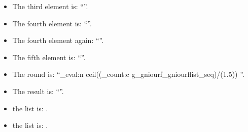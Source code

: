\documentclass{article}
\newcommand{\fourthelement}{\getnthelement{4}}
\begin{document}
\addtogniourflist[fiddle]{}
\getsizelist[fiddle]

\begin{itemize}
\item The third element is: ``''.
\item The fourth element is: ``\fourthelement''.
\item The fourth element again: ``\fourthelement''.
\item The fifth element is: ``''.
\item The round is: ``\fp_eval:n { ceil((\seq_count:c {g_gniourf_gniourflist_seq})/(1.5)) } ''.    
\item The result is: ``''. 
\item the list is:   .
\item the list is:   .

\end{itemize}





\texttt{\meaning\playaroundelement}
\end{document}
